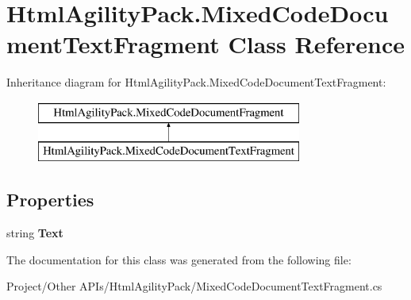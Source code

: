 \hypertarget{class_html_agility_pack_1_1_mixed_code_document_text_fragment}{}\section{Html\+Agility\+Pack.\+Mixed\+Code\+Document\+Text\+Fragment Class Reference}
\label{class_html_agility_pack_1_1_mixed_code_document_text_fragment}
Inheritance diagram for Html\+Agility\+Pack.\+Mixed\+Code\+Document\+Text\+Fragment\+:\begin{figure}[H]
\begin{center}
\leavevmode
\includegraphics[height=2.000000cm]{class_html_agility_pack_1_1_mixed_code_document_text_fragment}
\end{center}
\end{figure}
\subsection*{Properties}
\begin{DoxyCompactItemize}
\item 
\mbox{\label{class_html_agility_pack_1_1_mixed_code_document_text_fragment_a97688fad96ae0ed3c6510e76321532e3}} 
string {\bfseries Text}
\end{DoxyCompactItemize}


The documentation for this class was generated from the following file\+:\begin{DoxyCompactItemize}
\item 
Project/\+Other A\+P\+Is/\+Html\+Agility\+Pack/Mixed\+Code\+Document\+Text\+Fragment.\+cs\end{DoxyCompactItemize}

